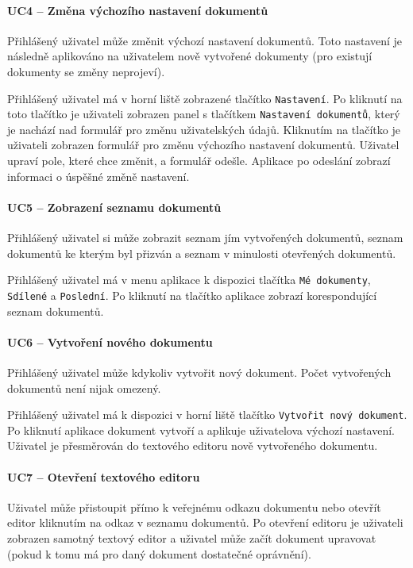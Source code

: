\paragraph{UC4 -- Změna výchozího nastavení dokumentů}

Přihlášený uživatel může změnit výchozí nastavení dokumentů.
Toto nastavení je následně aplikováno na uživatelem nově vytvořené dokumenty (pro existují dokumenty se změny neprojeví).

Přihlášený uživatel má v horní liště zobrazené tlačítko \texttt{Nastavení}.
Po kliknutí na toto tlačítko je uživateli zobrazen panel s tlačítkem \texttt{Nastavení dokumentů}, který je nachází nad formulář pro změnu uživatelských údajů.
Kliknutím na tlačítko je uživateli zobrazen formulář pro změnu výchozího nastavení dokumentů.
Uživatel upraví pole, které chce změnit, a formulář odešle.
Aplikace po odeslání zobrazí informaci o úspěšné změně nastavení.

\paragraph{UC5 -- Zobrazení seznamu dokumentů}

Přihlášený uživatel si může zobrazit seznam jím vytvořených dokumentů, seznam dokumentů ke kterým byl přizván a seznam v minulosti otevřených dokumentů.

Přihlášený uživatel má v menu aplikace k dispozici tlačítka \texttt{Mé dokumenty}, \texttt{Sdílené} a \texttt{Poslední}.
Po kliknutí na tlačítko aplikace zobrazí korespondující seznam dokumentů.

\paragraph{UC6 -- Vytvoření nového dokumentu}

Přihlášený uživatel může kdykoliv vytvořit nový dokument.
Počet vytvořených dokumentů není nijak omezený.

Přihlášený uživatel má k dispozici v horní liště tlačítko \texttt{Vytvořit nový dokument}.
Po kliknutí aplikace dokument vytvoří a aplikuje uživatelova výchozí nastavení.
Uživatel je přesměrován do textového editoru nově vytvořeného dokumentu.

\paragraph{UC7 -- Otevření textového editoru}

Uživatel může přistoupit přímo k veřejnému odkazu dokumentu nebo otevřít editor kliknutím na odkaz v seznamu dokumentů.
Po otevření editoru je uživateli zobrazen samotný textový editor a uživatel může začít dokument upravovat (pokud k tomu má pro daný dokument dostatečné oprávnění).

